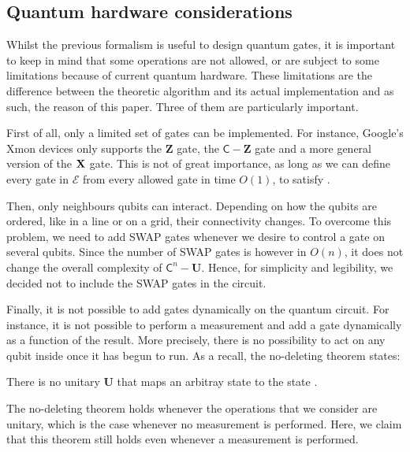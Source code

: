 \documentclass[11pt, a4paper]{article}
\begin{document}
        \subsection{Quantum hardware considerations}
            \label{subsec:Hardware}
            Whilst the previous formalism is useful to design quantum gates, it is important to keep in mind that some operations are not allowed, or are subject to some limitations because of current quantum hardware. These limitations are the difference between the theoretic algorithm and its actual implementation and as such, the reason of this paper. Three of them are particularly important.
            
            First of all, only a limited set of gates can be implemented. For instance, Google’s Xmon devices only supports the \(\mathbf{Z}\) gate, the \(\mathsf{C}-\mathbf{Z}\) gate and a more general version of the \(\mathbf{X}\) gate. This is not of great importance, as long as we can define every gate in \(\mathcal{E}\) from every allowed gate in time \(O(1)\), to satisfy .
            
            Then, only neighbours qubits can interact. Depending on how the qubits are ordered, like in a line or on a grid, their connectivity changes. To overcome this problem, we need to add SWAP gates whenever we desire to control a gate on several qubits. Since the number of SWAP gates is however in \(O(n)\), it does not change the overall complexity of \(\mathsf{C}^n-\mathbf{U}\). Hence, for simplicity and legibility, we decided not to include the SWAP gates in the circuit.
            
            Finally, it is not possible to add gates dynamically on the quantum circuit. For instance, it is not possible to perform a measurement and add a gate dynamically as a function of the result. More precisely, there is no possibility to act on any qubit inside once it has begun to run. As a recall, the no-deleting theorem states:
            
            \begin{theorem}
                There is no unitary \(\mathbf{U}\) that maps an arbitray state \ket{\psi} to the state .
            \end{theorem}
            
            The no-deleting theorem holds whenever the operations that we consider are unitary, which is the case whenever no measurement is performed. Here, we claim that this theorem still holds even whenever a measurement is performed.
            
\end{document}
